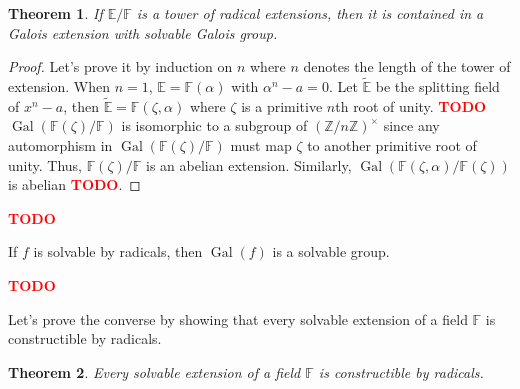 \documentclass{article}
\theoremstyle{plain}
\newtheorem{theorem}{Theorem}[subsection]
\theoremstyle{definition}
\newcommand{\F}{\mathbb{F}}
\newcommand{\E}{\mathbb{E}}
\newcommand{\Zn}[1]{\mathbb{Z}/ #1 \mathbb{Z}}
\DeclareMathOperator{\Gal}{Gal}
\newcommand{\td}{\textcolor{red}{\textbf{TODO}}}
\begin{document}
\begin{theorem}
    If $\E / \F$ is a tower of radical extensions, then it is contained in a Galois extension with solvable Galois group.
\end{theorem}

\begin{proof}
    Let's prove it by induction on $n$ where $n$ denotes the length of the tower of extension. When $n = 1$, $\E = \F(\alpha)$ with $\alpha^n - a = 0$. Let $\tilde{\E}$ be the splitting field of $x^n - a$, then $\tilde{\E} = \F(\zeta, \alpha)$ where $\zeta$ is a primitive $n$th root of unity. \td $\Gal(\F(\zeta) / \F)$ is isomorphic to a subgroup of $(\Zn{n})^{\times}$ since any automorphism in $\Gal(\F(\zeta) / \F)$ must map $\zeta$ to another primitive root of unity. Thus, $\F(\zeta) / \F$ is an abelian extension. Similarly, $\Gal(\F(\zeta, \alpha) / \F(\zeta))$ is abelian \td .
\end{proof}

\td 

If $f$ is solvable by radicals, then $\Gal(f)$ is a solvable group.

\td 


Let's prove the converse by showing that every solvable extension of a field $\F$ is constructible by radicals.

\begin{theorem}
    Every solvable extension of a field $\F$ is constructible by radicals.
\end{theorem}
\end{document}
